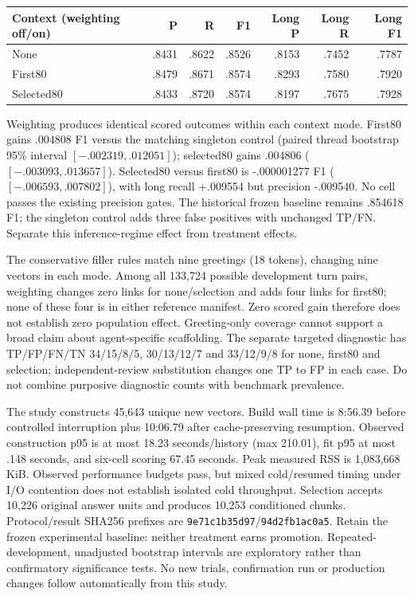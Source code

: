 \documentclass[11pt]{article}
\begin{document}
\begin{center}
\begin{tabular}{lrrrrrr}
\hline
Context (weighting off/on) & P & R & F1 & Long P & Long R & Long F1\\
\hline
None & .8431 & .8622 & .8526 & .8153 & .7452 & .7787\\
First80 & .8479 & .8671 & .8574 & .8293 & .7580 & .7920\\
Selected80 & .8433 & .8720 & .8574 & .8197 & .7675 & .7928\\
\hline
\end{tabular}
\end{center}
Weighting produces identical scored outcomes within each context mode.
First80 gains .004808 F1 versus the matching singleton control (paired thread
bootstrap 95\% interval $[-.002319,.012051]$); selected80 gains .004806
($[-.003093,.013657]$). Selected80 versus first80 is -.000001277 F1
($[-.006593,.007802]$), with long recall +.009554 but precision -.009540.
No cell passes the existing precision gates. The historical frozen baseline
remains .854618 F1; the singleton control adds three false positives with
unchanged TP/FN. Separate this inference-regime effect from treatment effects.

The conservative filler rules match nine greetings (18 tokens), changing nine
vectors in each mode. Among all 133,724 possible development turn pairs,
weighting changes zero links for none/selection and adds four links for first80;
none of these four is in either reference manifest. Zero scored gain therefore
does not establish zero population effect. Greeting-only coverage cannot support
a broad claim about agent-specific scaffolding. The separate targeted diagnostic
has TP/FP/FN/TN 34/15/8/5, 30/13/12/7 and 33/12/9/8 for none, first80 and
selection; independent-review substitution changes one TP to FP in each case.
Do not combine purposive diagnostic counts with benchmark prevalence.

The study constructs 45,643 unique new vectors. Build wall time is 8:56.39 before
controlled interruption plus 10:06.79 after cache-preserving resumption.
Observed construction p95 is at most 18.23 seconds/history (max 210.01), fit p95
at most .148 seconds, and six-cell scoring 67.45 seconds. Peak measured RSS is
1,083,668 KiB. Observed performance budgets pass, but mixed cold/resumed timing
under I/O contention does not establish isolated cold throughput. Selection
accepts 10,226 original answer units and produces 10,253 conditioned chunks.
Protocol/result SHA256 prefixes are \texttt{9e71c1b35d97}/\texttt{94d2fb1ac0a5}.
Retain the frozen experimental baseline: neither treatment earns promotion.
Repeated-development, unadjusted bootstrap intervals are exploratory rather
than confirmatory significance tests. No new trials, confirmation run or
production changes follow automatically from this study.
\end{document}
